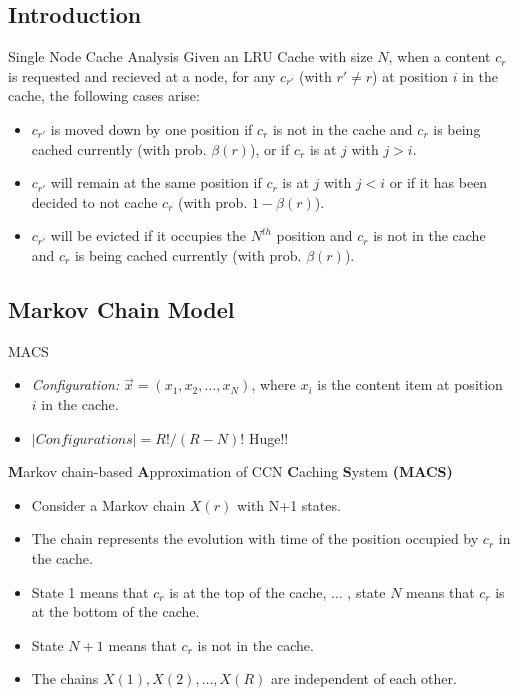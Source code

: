 \documentclass[
	xcolor={svgnames},
	hyperref={pagebackref,bookmarks},
	aspectratio=43,
]{beamer}
\begin{document}
\subsection*{Introduction}
\begin{frame}{Single Node Cache Analysis}
    Given an LRU Cache with size $N$, when a content $c_r$ is requested and recieved at a node, for any $c_{r'}$ (with $r' \neq r$) at position $i$ in the cache, the following cases arise:
    \begin{itemize}
        \item $c_{r'}$ is moved down by one position if $c_r$ is not in the cache and $c_r$ is being cached currently (with prob. $\beta(r)$), or if $c_r$ is at $j$ with $j > i$.
        \item $c_{r'}$ will remain at the same position if $c_r$ is at $j$ with $j < i$ or if it has been decided to not cache $c_r$ (with prob. $1 - \beta(r)$).
        \item $c_{r'}$ will be evicted if it occupies the $N^{th}$ position and $c_r$ is not in the cache and $c_r$ is being cached currently (with prob. $\beta(r)$).
    \end{itemize}
\end{frame}

\subsection*{Markov Chain Model}
\begin{frame}{MACS}
    \begin{itemize}
        \item \textit{Configuration:} $\vec{x} = (x_1, x_2, \ldots, x_N)$, where $x_i$ is the content item at position $i$ in the cache.
        \item $|Configurations| = R!/(R-N)!$ \quad Huge!!
    \end{itemize}
    \begin{block}{\textbf{M}arkov chain-based \textbf{A}pproximation of CCN \textbf{C}aching \textbf{S}ystem \textbf{(MACS)}}
        \begin{itemize}
            \item Consider a Markov chain $X(r)$ with N+1 states.
            \item The chain represents the evolution with time of the position occupied by $c_r$ in the cache.
            \item State 1 means that $c_r$ is at the top of the cache, $\ldots$ , state $N$ means that $c_r$ is at the bottom of the cache.
            \item State $N+1$ means that $c_r$ is not in the cache.
            \item The chains $X(1), X(2), \ldots , X(R)$ are independent of each other.
        \end{itemize}
    \end{block}
\end{frame}
\end{document}
